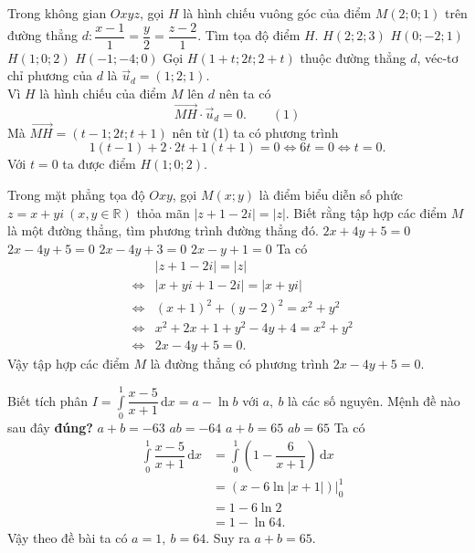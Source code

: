 \begin{ex}%
	Trong không gian $Oxyz$, gọi $H$ là hình chiếu vuông góc của điểm $M(2;0;1)$ trên đường thẳng $d\colon\dfrac{x-1}{1}=\dfrac{y}{2}=\dfrac{z-2}{1}$. Tìm tọa độ điểm $H$.
	\choice
	{$H(2;2;3)$}
	{$H(0;-2;1)$}
	{\True $H(1;0;2)$}
	{$H(-1;-4;0)$}
	\loigiai
	{
		Gọi $H(1+t;2t;2+t)$ thuộc đường thẳng $d$, véc-tơ chỉ phương của $d$ là $\vec{u}_d=(1;2;1)$.\\
		Vì $H$ là hình chiếu của điểm $M$ lên $d$ nên ta có \[\vec{MH}\cdot\vec{u}_d=0.\qquad(1)\]
		Mà $\vec{MH}=(t-1;2t;t+1)$ nên từ (1) ta có phương trình 
		\[1(t-1)+2\cdot2t+1(t+1)=0\Leftrightarrow 6t=0\Leftrightarrow t=0.\]
		Với $t=0$ ta được điểm $H(1;0;2)$.
	}
\end{ex}

\begin{ex}%
	Trong mặt phẳng tọa độ $Oxy$, gọi $M(x;y)$ là điểm biểu diễn số phức $z=x+yi~(x,y\in\mathbb{R})$ thỏa mãn $|z+1-2i|=|z|$. Biết rằng tập hợp các điểm $M$ là một đường thẳng, tìm phương trình đường thẳng đó.
	\choice
	{$2x+4y+5=0$}
	{\True $2x-4y+5=0$}
	{$2x-4y+3=0$}
	{$2x-y+1=0$}
	\loigiai
	{
		Ta có
		\begin{eqnarray*}
			& &|z+1-2i|=|z| \\
			& \Leftrightarrow &|x+yi+1-2i|=|x+yi| \\
			& \Leftrightarrow &(x+1)^2+(y-2)^2=x^2+y^2 \\
			& \Leftrightarrow &x^2+2x+1+y^2-4y+4=x^2+y^2 \\
			& \Leftrightarrow &2x-4y+5=0.
		\end{eqnarray*}
	Vậy tập hợp các điểm $M$ là đường thẳng có phương trình $2x-4y+5=0$. 
	}
\end{ex}

\begin{ex}%
	Biết tích phân $I=\displaystyle\int\limits_0^1 \dfrac{x-5}{x+1}\mathrm{\,d}x=a-\ln b$ với $a,~b$ là các số nguyên. Mệnh đề nào sau đây \textbf{đúng?}
	\choice
	{$a+b=-63$}
	{$ab=-64$}
	{\True $a+b=65$}
	{$ab=65$}
	\loigiai
	{
		Ta có
		\begin{eqnarray*}
			& \displaystyle\int\limits_0^1 \dfrac{x-5}{x+1}\mathrm{\,d}x&=\displaystyle\int\limits_0^1 \left(1-\dfrac{6}{x+1}\right)\mathrm{\,d}x\\
			& &=\left(x-6\ln|x+1|\right)\bigg|_0^1\\
			& &=1-6\ln2\\
			& &=1-\ln64.
		\end{eqnarray*}
	Vậy theo đề bài ta có $a=1,~b=64$. Suy ra $a+b=65$.
	}
\end{ex}

